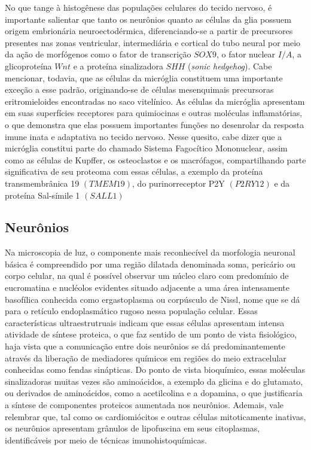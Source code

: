 \documentclass[
]{book}
\theoremstyle{definition}
\theoremstyle{definition}
\theoremstyle{definition}
\theoremstyle{definition}
\theoremstyle{remark}
\begin{document}
No que tange à histogênese das populações celulares do tecido nervoso, é importante salientar que tanto os neurônios quanto as células da glia possuem origem embrionária neuroectodérmica, diferenciando-se a partir de precursores presentes nas zonas ventricular, intermediária e cortical do tubo neural por meio da ação de morfógenos como o fator de transcrição \(SOX9\), o fator nuclear \(I/A\), a glicoproteína \(Wnt\) e a proteína sinalizadora \(SHH\) (\emph{sonic hedgehog}). Cabe mencionar, todavia, que as células da micróglia constituem uma importante exceção a esse padrão, originando-se de células mesenquimais precursoras eritromieloides encontradas no saco vitelínico. As células da micróglia apresentam em suas superfícies receptores para quimiocinas e outras moléculas inflamatórias, o que demonstra que elas possuem importantes funções no desenrolar da resposta imune inata e adaptativa no tecido nervoso. Nesse quesito, cabe dizer que a micróglia constitui parte do chamado Sistema Fagocítico Mononuclear, assim como as células de Kupffer, os osteoclastos e os macrófagos, compartilhando parte significativa de seu proteoma com essas células, a exemplo da proteína transmembrânica 19 \((TMEM19)\), do purinorreceptor P2Y \((P2RY12)\) e da proteína Sal-símile 1 \((SALL1)\)

\hypertarget{neuruxf4nios}{%
\subsection*{Neurônios}\label{neuruxf4nios}}

Na microscopia de luz, o componente mais reconhecível da morfologia neuronal básica é compreendido por uma região dilatada denominada soma, pericário ou corpo celular, na qual é possível observar um núcleo claro com predomínio de eucromatina e nucléolos evidentes situado adjacente a uma área intensamente basofílica conhecida como ergastoplasma ou corpúsculo de Nissl, nome que se dá para o retículo endoplasmático rugoso nessa população celular. Essas características ultraestrutruais indicam que essas células apresentam intensa atividade de síntese proteica, o que faz sentido de um ponto de vista fisiológico, haja vista que a comunicação entre dois neurônios se dá predominantemente através da liberação de mediadores químicos em regiões do meio extracelular conhecidas como fendas sinápticas. Do ponto de vista bioquímico, essas moléculas sinalizadoras muitas vezes são aminoácidos, a exemplo da glicina e do glutamato, ou derivados de aminoácidos, como a acetilcolina e a dopamina, o que justificaria a síntese de componentes proteicos aumentada nos neurônios. Ademais, vale relembrar que, tal como os cardiomiócitos e outras células mitoticamente inativas, os neurônios apresentam grânulos de lipofuscina em seus citoplasmas, identificáveis por meio de técnicas imunohistoquímicas.
\end{document}
